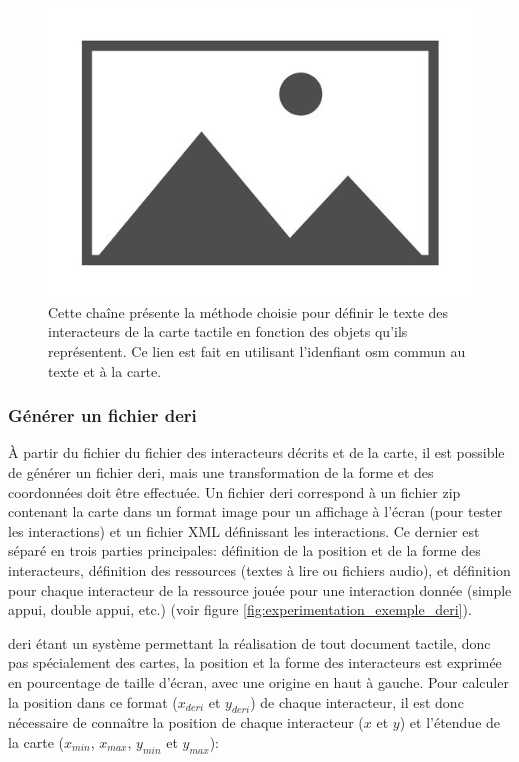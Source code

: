 \begin{figure}[ht]
    \centering
    \includegraphics{images/placeholder.jpg}
    \caption{Cette chaîne présente la méthode choisie pour définir le texte des interacteurs de la carte tactile en fonction des objets qu'ils représentent. Ce lien est fait en utilisant l'idenfiant \gls{osm} commun au texte et à la carte.}
    \label{fig:experimentation_lien_carte_texte}
\end{figure}

\subsubsection{Générer un fichier \gls{deri}}

À partir du fichier du fichier des interacteurs décrits et de la carte, il est possible de générer un fichier \gls{deri}, mais une transformation de la forme et des coordonnées doit être effectuée. Un fichier \gls{deri} correspond à un fichier zip contenant la carte dans un format image pour un affichage à l'écran (pour tester les interactions) et un fichier XML définissant les interactions. Ce dernier est séparé en trois parties principales: définition de la position et de la forme des interacteurs, définition des ressources (textes à lire ou fichiers audio), et définition pour chaque interacteur de la ressource jouée pour une interaction donnée (simple appui, double appui, etc.) (voir figure \ref{fig:experimentation_exemple_deri}). 

\newpar{}

\gls{deri} étant un système permettant la réalisation de tout document tactile, donc pas spécialement des cartes, la position et la forme des interacteurs est exprimée en pourcentage de taille d'écran, avec une origine en haut à gauche. Pour calculer la position dans ce format ($x_{deri}$ et $y_{deri}$) de chaque interacteur, il est donc nécessaire de connaître la position de chaque interacteur ($x$ et $y$) et l'étendue de la carte ($x_{min}$, $x_{max}$, $y_{min}$ et $y_{max}$):

